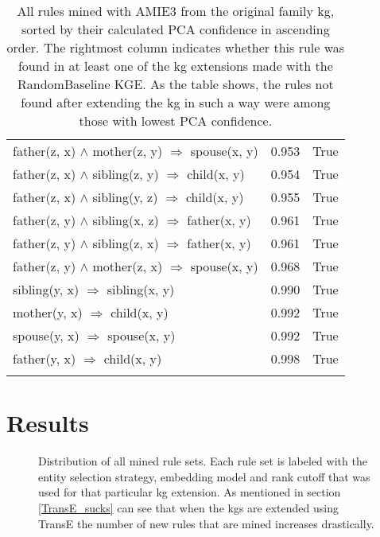 \begin{longtable}{lrl}
      father(z, x) $\wedge$ mother(z, y)   $\Rightarrow$ spouse(x, y) &           0.953 &                     True \\
      father(z, x) $\wedge$ sibling(z, y)   $\Rightarrow$ child(x, y) &           0.954 &                     True \\
      father(z, x) $\wedge$ sibling(y, z)   $\Rightarrow$ child(x, y) &           0.955 &                     True \\
     father(z, y) $\wedge$ sibling(x, z)   $\Rightarrow$ father(x, y) &           0.961 &                     True \\
     father(z, y) $\wedge$ sibling(z, x)   $\Rightarrow$ father(x, y) &           0.961 &                     True \\
      father(z, y) $\wedge$ mother(z, x)   $\Rightarrow$ spouse(x, y) &           0.968 &                     True \\
                    sibling(y, x)   $\Rightarrow$ sibling(x, y) &           0.990 &                     True \\
                       mother(y, x)   $\Rightarrow$ child(x, y) &           0.992 &                     True \\
                      spouse(y, x)   $\Rightarrow$ spouse(x, y) &           0.992 &                     True \\
                       father(y, x)   $\Rightarrow$ child(x, y) &           0.998 &                     True \\
\bottomrule
\caption[Original rules listed family KG]{All rules mined with AMIE3 from the original family \gls{kg}, sorted by their calculated PCA confidence in ascending order. The rightmost column indicates whether this rule was found in at least one of the \gls{kg} extensions made with the RandomBaseline KGE. As the table shows, the rules not found after extending the \gls{kg} in such a way were among those with lowest PCA confidence.}
\label{original_rules_found_by_baseline_family}
\end{longtable}


\chapter{Results}

\begin{figure}[htbp]
\centering
    \centering
    
    \caption[Dist. of all sets of mined rules.]{Distribution of all mined rule sets. Each rule set is labeled with the entity selection strategy, embedding model and rank cutoff that was used for that particular \gls{kg} extension. As mentioned in section \ref{TransE_sucks} can see that when the \glspl{kg} are extended using TransE the number of new rules that are mined increases drastically.}
    \label{all_sets}
\end{figure}


